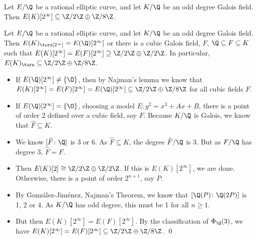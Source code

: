 \begin{frame}[plain]
\scriptsize
\begin{lem}
Let $E/\Q$ be a rational elliptic curve, and let $K/\Q$ be an odd degree Galois field. Then $E(K)[2^\infty] \subseteq \Z/2\Z \oplus \Z/8\Z$. 
\end{lem}

\begin{lem}
Let $E/\Q$ be a rational elliptic curve, and let $K/\Q$ be an odd degree Galois field. Then $E(K)_\tors[2^\infty]= E(\Q)[2^\infty]$ or there is a cubic Galois field, $F$, $\Q \subseteq F \subseteq K$ such that $E(K)[2^\infty]= E(F)[2^\infty] \supseteq \Z/2\Z \oplus \Z/2\Z$. In particular, $E(K)_\tors \subseteq \Z/2\Z \oplus \Z/8\Z$.  
\end{lem} 

\pf 
\begin{itemize}
\item If $E(\Q)[2^\infty] \neq \{ \O \}$, then by Najman's lemma we know that $E(K)[2^\infty]= E(F)[2^\infty]= E(\Q)[2^\infty] \subseteq \Z/2\Z \oplus \Z/8\Z$ for all cubic fields $F$.
\item If $E(\Q)[2^\infty]= \{ \O \}$, choosing a model $E: y^2= x^3 + Ax + B$, there is a point of order 2 defined over a cubic field, say $F$. Because $K/\Q$ is Galois, we know that $\widehat{F} \subseteq K$. 
\item We know $[\widehat{F} \colon \Q]$ is 3 or 6. As $\widehat{F} \subseteq K$, the degree $\widehat{F}/\Q$ is 3. But as $F/\Q$ has degree 3, $\widehat{F}= F$.
\item Then $E(K)[2] \cong \Z/2\Z \oplus \Z/2\Z$. If this is $E(K)[2^\infty]$, we are done. Otherwise, there is a point of order $2^{n+1}$, say $P$.
\item By Gonz\'alez-Jim\'enez, Najman's Theorem, we know that $[\Q(P) \colon \Q(2P)]$ is 1, 2 or 4. As $K/\Q$ has odd degree, this must be 1 for all $n \geq 1$. 
\item But then $E(K)[2^\infty]= E(F)[2^\infty]$. By the classification of $\Phi_\Q(3)$, we have $E(K)[2^\infty]= E(F)[2^\infty] \subseteq \Z/2\Z \oplus \Z/8\Z$. \hfill\qed
\end{itemize}
\end{frame}





